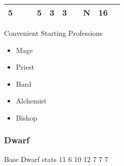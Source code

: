 \documentclass[12pt]{article}
\newcommand{\WviiTwoColumnSetup}{\raggedcolumns\RaggedRight}
\begin{document}
\begin{longtable}[]{@{}llllllllll@{}}
\begin{minipage}[t]{0.06\columnwidth}\raggedright\strut
5
\strut\end{minipage} &
\begin{minipage}[t]{0.06\columnwidth}\raggedright\strut
\strut\end{minipage} &
\begin{minipage}[t]{0.06\columnwidth}\raggedright\strut
\strut\end{minipage} &
\begin{minipage}[t]{0.06\columnwidth}\raggedright\strut
5
\strut\end{minipage} &
\begin{minipage}[t]{0.06\columnwidth}\raggedright\strut
3
\strut\end{minipage} &
\begin{minipage}[t]{0.06\columnwidth}\raggedright\strut
3
\strut\end{minipage} &
\begin{minipage}[t]{0.06\columnwidth}\raggedright\strut
\strut\end{minipage} &
\begin{minipage}[t]{0.07\columnwidth}\raggedright\strut
N
\strut\end{minipage} &
\begin{minipage}[t]{0.08\columnwidth}\raggedright\strut
16
\strut\end{minipage}\tabularnewline
\bottomrule
\end{longtable}

Convenient Starting Professions

\begin{multicols}{2}\WviiTwoColumnSetup
\begin{itemize}
\item
  Mage
\item
  Priest
\item
  Bard
\item
  Alchemist
\item
  Bishop
\end{itemize}
\end{multicols}

\subsubsection{Dwarf}\label{dwarf}

Base Dwarf stats 11 6 10 12 7 7 7
\end{document}
